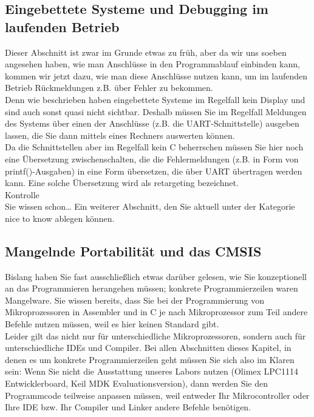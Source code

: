 \subsection{Eingebettete Systeme und Debugging im laufenden Betrieb}

Dieser Abschnitt ist zwar im Grunde etwas zu früh, aber da wir uns soeben angesehen haben, wie man Anschlüsse in den Programmablauf einbinden kann, kommen wir jetzt dazu, wie man diese Anschlüsse nutzen kann, um im laufenden Betrieb Rückmeldungen z.B. über Fehler zu bekommen.\\

Denn wie beschrieben haben eingebettete Systeme im Regelfall kein Display und sind auch sonst quasi nicht sichtbar. Deshalb müssen Sie im Regelfall Meldungen des Systems über einen der Anschlüsse (z.B. die UART-Schnittstelle) ausgeben lassen, die Sie dann mittels eines Rechners auswerten können.\\

Da die Schnittstellen aber im Regelfall kein C beherrschen müssen Sie hier noch eine Übersetzung zwischenschalten, die die Fehlermeldungen (z.B. in Form von printf()-Ausgaben) in eine Form übersetzen, die über UART übertragen werden kann. Eine solche Übersetzung wird als retargeting bezeichnet.\\

Kontrolle\\

Sie wissen schon… Ein weiterer Abschnitt, den Sie aktuell unter der Kategorie nice to know ablegen können.

\subsection{Mangelnde Portabilität und das CMSIS}

Bislang haben Sie fast ausschließlich etwas darüber gelesen, wie Sie konzeptionell an das Programmieren herangehen müssen; konkrete Programmierzeilen waren Mangelware. Sie wissen bereits, dass Sie bei der Programmierung von Mikroprozessoren in Assembler und in C je nach Mikroprozessor zum Teil andere Befehle nutzen müssen, weil es hier keinen Standard gibt.\\

Leider gilt das nicht nur für unterschiedliche Mikroprozessoren, sondern auch für unterschiedliche IDEs und Compiler. Bei allen Abschnitten dieses Kapitel, in denen es um konkrete Programmierzeilen geht müssen Sie sich also im Klaren sein: Wenn Sie nicht die Ausstattung unseres Labors nutzen (Olimex LPC1114 Entwicklerboard, Keil MDK Evaluationsversion), dann werden Sie den Programmcode teilweise anpassen müssen, weil entweder Ihr Mikrocontroller oder Ihre IDE bzw. Ihr Compiler und Linker  andere Befehle benötigen.\\

